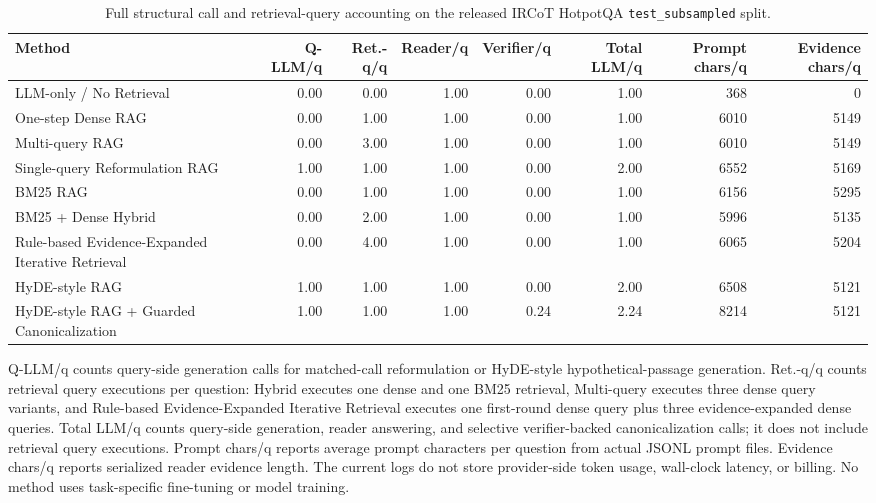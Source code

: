 \begin{table}[t]
\centering
\caption{Full structural call and retrieval-query accounting on the released IRCoT HotpotQA \texttt{test\_subsampled} split.}
\label{tab:efficiency_profile_full}
\scriptsize
\begin{threeparttable}
\setlength{\tabcolsep}{3pt}
\begin{tabularx}{\textwidth}{>{\raggedright\arraybackslash}X r r r r r r r}
\toprule
Method & Q-LLM/q & Ret.-q/q & Reader/q & Verifier/q & Total LLM/q & Prompt chars/q & Evidence chars/q \\
\midrule
LLM-only / No Retrieval & 0.00 & 0.00 & 1.00 & 0.00 & 1.00 & 368 & 0 \\
One-step Dense RAG & 0.00 & 1.00 & 1.00 & 0.00 & 1.00 & 6010 & 5149 \\
Multi-query RAG & 0.00 & 3.00 & 1.00 & 0.00 & 1.00 & 6010 & 5149 \\
Single-query Reformulation RAG & 1.00 & 1.00 & 1.00 & 0.00 & 2.00 & 6552 & 5169 \\
BM25 RAG & 0.00 & 1.00 & 1.00 & 0.00 & 1.00 & 6156 & 5295 \\
BM25 + Dense Hybrid & 0.00 & 2.00 & 1.00 & 0.00 & 1.00 & 5996 & 5135 \\
Rule-based Evidence-Expanded Iterative Retrieval & 0.00 & 4.00 & 1.00 & 0.00 & 1.00 & 6065 & 5204 \\
HyDE-style RAG & 1.00 & 1.00 & 1.00 & 0.00 & 2.00 & 6508 & 5121 \\
HyDE-style RAG + Guarded Canonicalization & 1.00 & 1.00 & 1.00 & 0.24 & 2.24 & 8214 & 5121 \\
\bottomrule
\end{tabularx}
\begin{tablenotes}
\footnotesize
\item Q-LLM/q counts query-side generation calls for matched-call reformulation or HyDE-style hypothetical-passage generation. Ret.-q/q counts retrieval query executions per question: Hybrid executes one dense and one BM25 retrieval, Multi-query executes three dense query variants, and Rule-based Evidence-Expanded Iterative Retrieval executes one first-round dense query plus three evidence-expanded dense queries. Total LLM/q counts query-side generation, reader answering, and selective verifier-backed canonicalization calls; it does not include retrieval query executions. Prompt chars/q reports average prompt characters per question from actual JSONL prompt files. Evidence chars/q reports serialized reader evidence length. The current logs do not store provider-side token usage, wall-clock latency, or billing. No method uses task-specific fine-tuning or model training.
\end{tablenotes}
\end{threeparttable}
\end{table}
